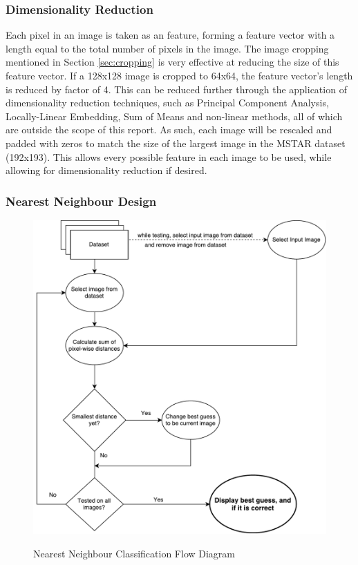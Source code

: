 \subsubsection{Dimensionality Reduction}
Each pixel in an image is taken as an feature, forming a feature vector with a length equal to the total number of pixels in the image. The image cropping mentioned in Section \ref{sec:cropping} is very effective at reducing the size of this feature vector. If a 128x128 image is cropped to 64x64, the feature vector's length is reduced by factor of 4. This can be reduced further through the application of dimensionality reduction techniques, such as Principal Component Analysis, Locally-Linear Embedding, Sum of Means and non-linear methods, all of which are outside the scope of this report. As such, each image will be rescaled and padded with zeros to match the size of the largest image in the MSTAR dataset (192x193). This allows every possible feature in each image to be used, while allowing for dimensionality reduction if desired.

\subsubsection{Nearest Neighbour Design}
\begin{figure}
\centering
\includegraphics[width=\textwidth]{figures/nearest-neighbour}
\label{fig:nn}
\caption{Nearest Neighbour Classification Flow Diagram}
\centering
\end{figure}

